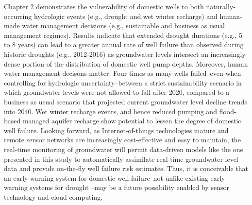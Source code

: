 Chapter 2 demonstrates the vulnerability of domestic wells to both naturally-occurring hydrologic events (e.g., drought and wet winter recharge) and human-made water management decisions (e.g., sustainable and business as usual management regimes). Results indicate that extended drought durations (e.g., 5 to 8 years) can lead to a greater annual rate of well failure than observed during historic droughts (e.g., 2012-2016) as groundwater levels intersect an increasingly dense portion of the distribution of domestic well pump depths. Moreover, human water management decisons matter. Four times as many wells failed--even when controlling for hydrologic uncertainty--between a strict sustainability scenario in which groundwater levels were not allowed to fall after 2020, compared to a business as usual scenario that projected current groundwater level decline trends into 2040. Wet winter recharge events, and hence reduced pumping \citep{Hanak2019} and flood-based managed aquifer recharge \citep{Kocis2017} show potential to lessen the degree of domestic well failure. Looking forward, as Internet-of-things technologies mature and remote sensor networks are increasingly cost-effective and easy to maintain, the real-time monitoring of groundwater \citep{calderwood2020low} will permit data-driven models like the one presented in this study to automatically assimilate real-time groundwater level data and provide on-the-fly well failure risk estimates. Thus, it is conceivable that an early warning system for domestic well failure--not unlike existing early warning systems for drought \citep{pozzi2013toward, huang2004drought}--may be a future possibility enabled by sensor technology and cloud computing.

